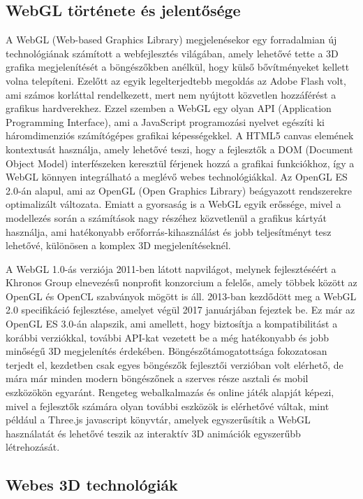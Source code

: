 \documentclass[12pt]{report}
\begin{document}
        \subsection{WebGL története és jelentősége}

        A WebGL (Web-based Graphics Library) megjelenésekor egy forradalmian új technológiának számított a webfejlesztés világában, amely lehetővé tette a 3D grafika megjelenítését a böngészőkben anélkül, hogy külső bővítményeket kellett volna telepíteni. Ezelőtt az egyik legelterjedtebb megoldás az Adobe Flash volt, ami számos korláttal rendelkezett, mert nem nyújtott közvetlen hozzáférést a grafikus hardverekhez. Ezzel szemben a WebGL egy olyan API (Application Programming Interface), ami a JavaScript programozási nyelvet egészíti ki háromdimenziós számítógépes grafikai képességekkel. A HTML5 canvas elemének kontextusát használja, amely lehetővé teszi, hogy a fejlesztők a DOM (Document Object Model) interfészeken keresztül férjenek hozzá a grafikai funkciókhoz, így a WebGL könnyen integrálható a meglévő webes technológiákkal. Az OpenGL ES 2.0-án alapul, ami az OpenGL (Open Graphics Library) beágyazott rendszerekre optimalizált változata. Emiatt a gyorsaság is a WebGL egyik erőssége, mivel a modellezés során a számítások nagy részéhez közvetlenül a grafikus kártyát használja, ami hatékonyabb erőforrás-kihasználást és jobb teljesítményt tesz lehetővé, különösen a komplex 3D megjelenítéseknél.
        
        A WebGL 1.0-ás verziója 2011-ben látott napvilágot, melynek fejlesztéséért a Khronos Group elnevezésű nonprofit konzorcium a felelős, amely többek között az OpenGL és OpenCL szabványok mögött is áll. 2013-ban kezdődött meg a WebGL 2.0 specifikáció fejlesztése, amelyet végül 2017 januárjában fejeztek be. Ez már az OpenGL ES 3.0-án alapszik, ami amellett, hogy biztosítja a kompatibilitást a korábbi verziókkal, további API-kat vezetett be a még hatékonyabb és jobb minőségű 3D megjelenítés érdekében.
        Böngészőtámogatottsága fokozatosan terjedt el, kezdetben csak egyes böngészők fejlesztői verzióban volt elérhető, de mára már minden modern böngészőnek a szerves része asztali és mobil eszközökön egyaránt. Rengeteg webalkalmazás és online játék alapját képezi, mivel a fejlesztők számára olyan további eszközök is elérhetővé váltak, mint például a Three.js javascript könyvtár, amelyek egyszerűsítik a WebGL használatát és lehetővé teszik az interaktív 3D animációk egyszerűbb létrehozását.
        
        \subsection{Webes 3D technológiák}
\end{document}
